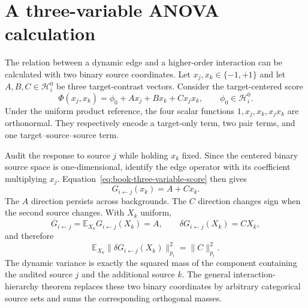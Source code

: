 \section{A three-variable ANOVA calculation}
\label{sec:book-three-variable-anova-primer}

The relation between a dynamic edge and a higher-order interaction can be calculated with two
binary source coordinates.  Let $x_j,x_k\in\{-1,+1\}$ and let
$A,B,C\in\mathcal H_i^0$ be three target-contrast vectors.  Consider the target-centered score
\begin{equation}
\Phi(x_j,x_k)
=\phi_0+A x_j+B x_k+C x_jx_k,
\qquad \phi_0\in\mathcal H_i^0.
\label{eq:book-three-variable-score}
\end{equation}
Under the uniform product reference, the four scalar functions
$1,x_j,x_k,x_jx_k$ are orthonormal.  They respectively encode a target-only term, two pair terms,
and one target--source--source term.

Audit the response to source $j$ while holding $x_k$ fixed.  Since the centered binary source
space is one-dimensional, identify the edge operator with its coefficient multiplying $x_j$.
Equation~\ref{eq:book-three-variable-score} then gives
\begin{equation}
G_{i\leftarrow j}(x_k)=A+C x_k.
\label{eq:book-three-variable-response}
\end{equation}
The $A$ direction persists across backgrounds.  The $C$ direction changes sign when the second
source changes.  With $X_k$ uniform,
\begin{equation}
\overline G_{i\leftarrow j}
=\mathbb E_{X_k}G_{i\leftarrow j}(X_k)=A,
\qquad
\delta G_{i\leftarrow j}(X_k)=C X_k,
\label{eq:book-three-variable-mean-residual}
\end{equation}
and therefore
\begin{equation}
\mathbb E_{X_k}
\|\delta G_{i\leftarrow j}(X_k)\|_{p_i}^2
=\|C\|_{p_i}^2.
\label{eq:book-three-variable-dynamic-variance}
\end{equation}
The dynamic variance is exactly the squared mass of the component containing the audited source
$j$ and the additional source $k$.  The general interaction-hierarchy theorem replaces these two
binary coordinates by arbitrary categorical source sets and sums the corresponding orthogonal
masses.

